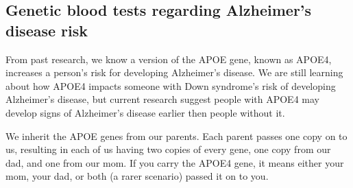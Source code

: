 \subsection{Genetic blood tests regarding Alzheimer’s disease risk}

From past research, we know a version of the APOE gene, known as APOE4,
increases a person’s risk for developing Alzheimer’s disease. We are still
learning about how APOE4 impacts someone with Down syndrome’s risk of developing
Alzheimer’s disease, but current research suggest people with APOE4 may develop
signs of Alzheimer’s disease earlier then people without it.

We inherit the APOE genes from our parents. Each parent passes one copy on to
us, resulting in each of us having two copies of every gene, one copy from our
dad, and one from our mom. If you carry the APOE4 gene, it means either your
mom, your dad, or both (a rarer scenario) passed it on to you. 
